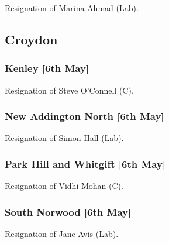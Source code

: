 \documentclass[a4paper,openany]{book}
\begin{document}
\begin{resultsiii}
Resignation of Marina Ahmad (Lab).

\subsection*{Croydon}

\subsubsection*{Kenley \hspace*{\fill}\nolinebreak[1]%
	\enspace\hspace*{\fill}
	[6th May]}


Resignation of Steve O'Connell (C).

\subsubsection*{New Addington North \hspace*{\fill}\nolinebreak[1]%
	\enspace\hspace*{\fill}
	[6th May]}


Resignation of Simon Hall (Lab).

\subsubsection*{Park Hill and Whitgift \hspace*{\fill}\nolinebreak[1]%
	\enspace\hspace*{\fill}
	[6th May]}


Resignation of Vidhi Mohan (C).

\subsubsection*{South Norwood \hspace*{\fill}\nolinebreak[1]%
	\enspace\hspace*{\fill}
	[6th May]}


Resignation of Jane Avis (Lab).


\end{resultsiii}
\end{document}
